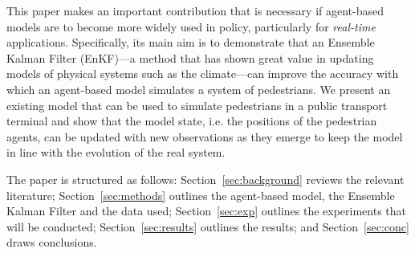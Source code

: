 \documentclass{article}
\begin{document}
This paper makes an important contribution that is necessary if agent-based models are to become more widely used in policy, particularly for \textit{real-time} applications. Specifically, its main aim is to demonstrate that an Ensemble Kalman Filter (EnKF)---a method that has shown great value in updating models of physical systems such as the climate---can improve the accuracy with which an agent-based model simulates a system of pedestrians. We present an existing model that can be used to simulate pedestrians in a public transport terminal and show that the model state, i.e. the positions of the pedestrian agents, can be updated with new observations as they emerge to keep the model in line with the evolution of the real system. 

The paper is structured as follows: Section~\ref{sec:background} reviews the relevant literature; Section~\ref{sec:methods} outlines the agent-based model, the Ensemble Kalman Filter and the data used; Section~\ref{sec:exp} outlines the experiments that will be conducted; Section~\ref{sec:results} outlines the results; and Section~\ref{sec:conc} draws conclusions.



\end{document}
